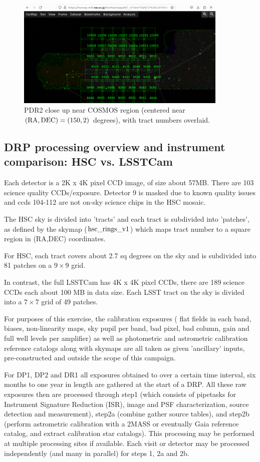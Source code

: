  \begin{figure}[hbt!]
 \includegraphics[width=0.9\textwidth]{hscmaptractcosmos.png}
	 \caption{PDR2 close up near COSMOS region (centered near $\rm (RA,DEC) = (150, 2)$ degrees), with tract numbers overlaid.  \label{fig:hscmaptract}}
 \end{figure}

\subsection{DRP processing overview and instrument comparison: HSC vs. LSSTCam}

Each detector is a 2K x 4K pixel CCD image, of size about 57MB.
There are 103 science quality CCDs/exposure.  Detector 9 is masked due
to known quality issues and ccds 104-112 are not on-sky science chips in
the HSC mosaic.

The HSC sky is divided into 'tracts' and each tract is subdivided 
into 'patches', as defined by the skymap ($\rm hsc\_rings\_v1$) which maps 
tract number to a square region in (RA,DEC) coordinates.

For HSC, each tract covers about 2.7 sq degrees on the sky and is
subdivided into 81 patches on a $9 \times 9$ grid.

In contrast, the full LSSTCam has 4K x 4K pixel CCDs, there are 
189 science CCDs each about 100 MB in data size.  Each LSST tract 
on the sky is divided into a $7\times 7$ grid of 49 patches.

For purposes of this exercise, the calibration exposures (
flat fields in each band, biases, non-linearity maps, sky pupil per 
band, bad pixel, bad column,  gain and full well levels per amplifier) as
well as photometric and astrometric calibration reference catalogs along
with skymaps are all taken as given 'ancillary' inputs, 
pre-constructed and outside the scope of this campaign.

For DP1, DP2 and DR1 all exposures obtained to over a certain time
interval, six months to one year in length are gathered at the
start of a DRP.  All these raw exposures then are processed through 
step1 (which consists of pipetasks for Instrument Signature 
Reduction (ISR), image and PSF characterization, source detection 
and measurement), 
step2a (combine gather source tables), and step2b (perform 
astrometric calibration with a 2MASS or eventually Gaia reference catalog,
and extract calibration star catalogs).
This processing may be performed at multiple processing sites if available.  
Each visit or detector may be processed independently (and many in parallel) 
for steps 1, 2a and 2b.

